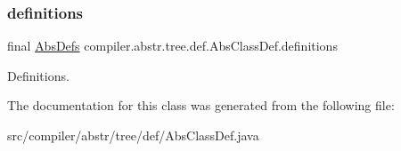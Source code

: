 \subsubsection{\texorpdfstring{definitions}{definitions}}
{\footnotesize\ttfamily final \hyperlink{classcompiler_1_1abstr_1_1tree_1_1_abs_defs}{Abs\+Defs} compiler.\+abstr.\+tree.\+def.\+Abs\+Class\+Def.\+definitions}

Definitions. 

The documentation for this class was generated from the following file\+:\begin{DoxyCompactItemize}
\item 
src/compiler/abstr/tree/def/Abs\+Class\+Def.\+java\end{DoxyCompactItemize}
